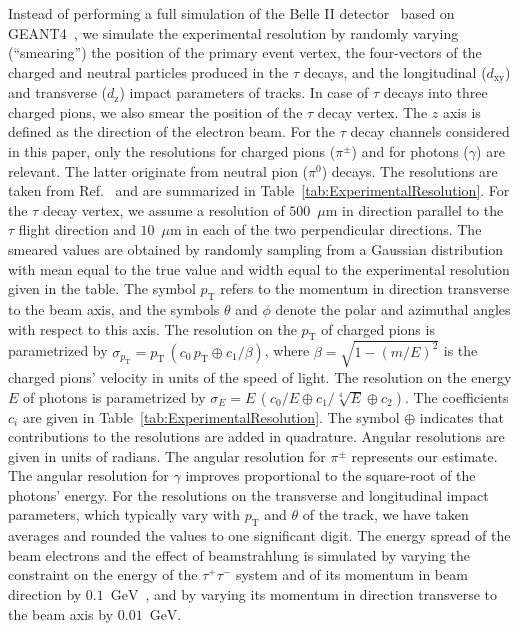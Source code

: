 \documentclass[a4paper,12pt,twocolumn]{article}
\numberwithin{equation}{section} %
\newcommand{\Pgg}{\ensuremath{\gamma}\xspace}
\newcommand{\Pgppm}{\ensuremath{\pi^{\pm}}\xspace}
\newcommand{\Pgpz}{\ensuremath{\pi^{\textrm{0}}}\xspace}
\newcommand{\Pgt}{\ensuremath{\tau}\xspace}
\newcommand{\Pgtm}{\ensuremath{\tau^{-}}\xspace}
\newcommand{\Pgtp}{\ensuremath{\tau^{+}}\xspace}
\newcommand{\GeV}{\ensuremath{\textrm{GeV}}\xspace}
\newcommand{\micron}{\ensuremath{\mu\textrm{m}}\xspace}
\newcommand{\energy}{\ensuremath{E}\xspace}
\newcommand{\pT}{\ensuremath{p_{\textrm{T}}}\xspace}
\newcommand{\dxy}{\ensuremath{d_{\textrm{xy}}}\xspace}
\newcommand{\dz}{\ensuremath{d_{\textrm{z}}}\xspace}
\begin{document}
Instead of performing a full simulation of the Belle II detector~\cite{Belle-II:2010dht} based on GEANT4~\cite{GEANT4:2002zbu},
we simulate the experimental resolution by randomly varying (``smearing'') the position of the primary event vertex, the four-vectors of the charged and neutral particles produced in the $\Pgt$ decays, and the longitudinal ($\dxy$) and transverse ($\dz$) impact parameters of tracks. In case of $\Pgt$ decays into three charged pions, we also smear the position of the $\Pgt$ decay vertex.
The $z$ axis is defined as the direction of the electron beam. 
For the $\Pgt$ decay channels considered in this paper, only the resolutions for charged pions ($\Pgppm$) and for photons ($\Pgg$) are relevant. The latter originate from neutral pion ($\Pgpz$) decays.
The resolutions are taken from Ref.~\cite{Belle-II:2010dht} and are summarized in Table~\ref{tab:ExperimentalResolution}.
For the $\Pgt$ decay vertex, we assume a resolution of $500$~\micron in direction parallel to the $\Pgt$ flight direction and $10$~\micron in each of the two perpendicular directions.
The smeared values are obtained by randomly sampling from a Gaussian distribution with mean equal to the true value and width equal to the experimental resolution given in the table.
The symbol $\pT$ refers to the momentum in direction transverse to the beam axis, and the symbols $\theta$ and $\phi$ denote the polar and azimuthal angles with respect to this axis.
The resolution on the $\pT$ of charged pions is parametrized by $\sigma_{\pT} = \pT \, ( c_{0} \, \pT \oplus c_{1}/\beta )$, where $\beta = \sqrt{1 - (m/E)^{2}}$ is the charged pions' velocity in units of the speed of light.
The resolution on the energy $\energy$ of photons is parametrized by $\sigma_{\energy} = \energy \, ( c_{0}/\energy \oplus c_{1}/\sqrt[4]{\energy} \oplus c_{2} )$. The coefficients $c_{i}$ are given in Table~\ref{tab:ExperimentalResolution}.
The symbol $\oplus$ indicates that contributions to the resolutions are added in quadrature.
Angular resolutions are given in units of radians.
The angular resolution for $\Pgppm$ represents our estimate.
The angular resolution for $\Pgg$ improves proportional to the square-root of the photons' energy.
For the resolutions on the transverse and longitudinal impact parameters, which typically vary with $\pT$ and $\theta$ of the track, we have taken averages and rounded the values to one significant digit.
The energy spread of the beam electrons and the effect of beamstrahlung is simulated by varying the constraint on the energy of the $\Pgtp\Pgtm$ system and of its momentum in beam direction by $0.1$~\GeV~\cite{Akai:2018mbz},
and by varying its momentum in direction transverse to the beam axis by $0.01$~\GeV.
\end{document}
